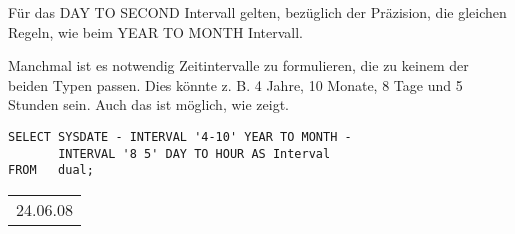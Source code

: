           \begin{merke}
            F\"ur das DAY TO SECOND Intervall gelten, bez\"uglich der
            Pr\"azision, die gleichen Regeln, wie beim YEAR TO MONTH Intervall.
          \end{merke}
          Manchmal ist es notwendig Zeitintervalle zu formulieren, die zu keinem
          der beiden Typen passen. Dies k\"onnte z. B. 4 Jahre, 10 Monate, 8
          Tage und 5 Stunden sein. Auch das ist m\"oglich, wie
           zeigt.
\clearpage
          \begin{lstlisting}[language=oracle_sql,caption={Ein komplexe Zeitintervall},label=sql03_21]
SELECT SYSDATE - INTERVAL '4-10' YEAR TO MONTH -
       INTERVAL '8 5' DAY TO HOUR AS Interval
FROM   dual;
          \end{lstlisting}
          \begin{center}
            \begin{small}
              \tablehead{}
              \begin{oraclesql}
                \begin{supertabular}{l}
                  24.06.08 \\
                \end{supertabular}
              \end{oraclesql}
            \end{small}
          \end{center}
